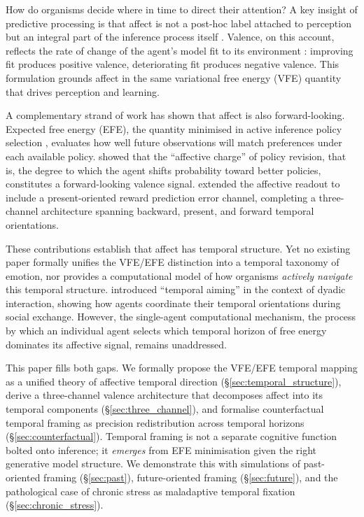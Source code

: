 \documentclass[11pt,a4paper]{article}
\begin{document}
How do organisms decide where in time to direct their attention? A key insight of predictive processing is that affect is not a post-hoc label attached to perception but an integral part of the inference process itself \citep{barrett2017theory, seth2016interoceptive}. Valence, on this account, reflects the rate of change of the agent's model fit to its environment \citep{joffily2013emotional}: improving fit produces positive valence, deteriorating fit produces negative valence. This formulation grounds affect in the same variational free energy (VFE) quantity that drives perception and learning.

A complementary strand of work has shown that affect is also forward-looking. Expected free energy (EFE), the quantity minimised in active inference policy selection \citep{parr2022active}, evaluates how well future observations will match preferences under each available policy. \citet{hesp2021deeply} showed that the ``affective charge'' of policy revision, that is, the degree to which the agent shifts probability toward better policies, constitutes a forward-looking valence signal. \citet{pattisapu2024free} extended the affective readout to include a present-oriented reward prediction error channel, completing a three-channel architecture spanning backward, present, and forward temporal orientations.

These contributions establish that affect has temporal structure. Yet no existing paper formally unifies the VFE/EFE distinction into a temporal taxonomy of emotion, nor provides a computational model of how organisms \emph{actively navigate} this temporal structure. \citet{hinrichs2025temporal} introduced ``temporal aiming'' in the context of dyadic interaction, showing how agents coordinate their temporal orientations during social exchange. However, the single-agent computational mechanism, the process by which an individual agent selects which temporal horizon of free energy dominates its affective signal, remains unaddressed.

This paper fills both gaps. We formally propose the VFE/EFE temporal mapping as a unified theory of affective temporal direction (\S\ref{sec:temporal_structure}), derive a three-channel valence architecture that decomposes affect into its temporal components (\S\ref{sec:three_channel}), and formalise counterfactual temporal framing as precision redistribution across temporal horizons (\S\ref{sec:counterfactual}). Temporal framing is not a separate cognitive function bolted onto inference; it \emph{emerges} from EFE minimisation given the right generative model structure. We demonstrate this with simulations of past-oriented framing (\S\ref{sec:past}), future-oriented framing (\S\ref{sec:future}), and the pathological case of chronic stress as maladaptive temporal fixation (\S\ref{sec:chronic_stress}).
\end{document}
